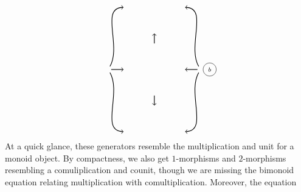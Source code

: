 \documentclass[11pt]{amsart}
\theoremstyle{remark}
\theoremstyle{definition}
\begin{document}
\[{\begin{tikzpicture}[scale=0.95]
\begin{scope}
\node [style=circle,draw=black] at (2.4,1) {\scriptsize $b$};
\end{scope}
\node (v1) at (-2,1) {};
\node (v2) at (-1.2,1) {};
\draw [thick,->]  (v1) edge (v2);
\node (v3) at (2,1) {};
\node (v4) at (1.2,1) {};
\draw [thick,->] (v3) edge (v4);
\node (v14) at (0,2) {};
\node (v15) at (0,2.7) {};
\draw [thick,->] (v14) edge (v15);
\node (v16) at (0,0) {};
\node (v17) at (0,-0.7) {};
\draw [thick,->] (v16) edge (v17);
\node (v18) at (-1.2,3.7) {};
\node (v19) at (-1.2,-1.7) {};
\draw [thick,->] (v1) edge [in=180, out=60] (v18);
\draw [thick,->] (v1) edge [in=180, out=-60] (v19);
\node (v20) at (1.2,3.7) {};
\node (v21) at (1.2,-1.7) {};
\draw [thick,->](v3) edge [in=0, out=120] (v20);
\draw [thick,->] (v3) edge [in=0, out=-120] (v21);
\end{tikzpicture}
}
\] 
At a quick glance, 
these generators resemble 
the multiplication and 
unit for a monoid object. 
By compactness, we also
get $1$-morphisms and 
$2$-morphisms resembling a
comuliplication and counit, 
though we are missing
the bimonoid equation relating
multiplication with comultiplication.
Moreover, the equation
\end{document}
